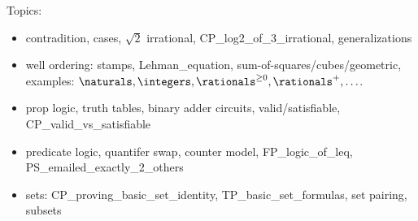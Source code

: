 \documentclass[quiz]{mcs}
\begin{document}


\examspace

\begin{staffnotes}
Topics:
\begin{itemize}
item buggy proof (possible miniquestion: what is the mathematical error re ``suprise''?)

\item contradition, cases, $\sqrt{2}$ irrational, CP\_log2\_of\_3_irrational, generalizations

\item well ordering: stamps, Lehman_equation,
  sum-of-squares/cubes/geometric, examples: $\naturals, \integers,
  \rationals^{\geq 0}, \rationals^{+}, \ldots$.

\item prop logic, truth tables, binary adder circuits, valid/satisfiable, CP\_valid\_vs\_satisfiable

\item predicate logic, quantifer swap, counter model, FP\_logic\_of\_leq, PS\_emailed\_exactly\_2\_others

\item sets: CP\_proving\_basic\_set\_identity, TP\_basic\_set\_formulas, set pairing, subsets
\end{itemize}
\end{staffnotes}




\end{document}
